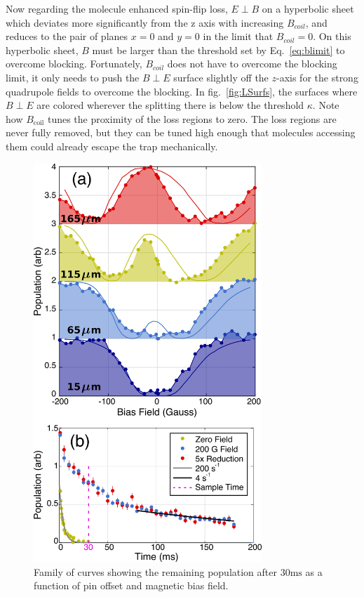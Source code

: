 \documentclass[%
 reprint,
 amsmath,amssymb,
 aps,
prl,
]{revtex4-1}
\begin{document}
Now regarding the molecule enhanced spin-flip loss, $E\!\perp\! B$ on a hyperbolic sheet which deviates more significantly from the z axis with increasing $B_{coil}$, and reduces to the pair of planes $x=0$ and $y=0$ in the limit that $B_{coil} = 0$. On this hyperbolic sheet, $B$ must be larger than the threshold set by Eq.~\ref{eq:blimit} to overcome blocking. Fortunately, $B_{coil}$ does not have to overcome the blocking limit, it only needs to push the $B\!\perp\! E$ surface slightly off the $z$-axis for the strong  quadrupole fields to overcome the blocking. In fig.~\ref{fig:LSurfs}, the surfaces where $B\!\perp\! E$ are colored wherever the splitting there is below the threshold $\kappa$. Note how $B_\text{coil}$ tunes the proximity of the loss regions to zero. The loss regions are never fully removed, but they can be tuned high enough that molecules accessing them could already escape the trap mechanically.

\begin{figure}
\includegraphics[width=86mm]{VWFig/tim-style-by-dave.png}%
\caption{
Family of curves showing the remaining population after $30 \text{ms}$ as a function of pin offset and magnetic bias field.
\label{fig:WVplot}}
\end{figure}
\end{document}

